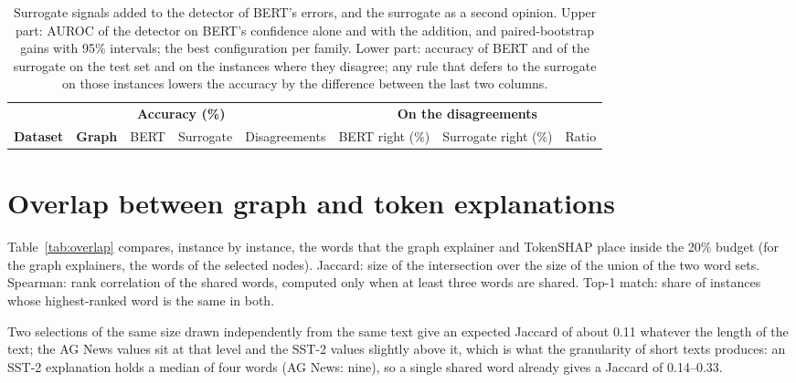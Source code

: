 \documentclass[review,12pt]{elsarticle}
\begin{document}
\begin{table}[H]
\centering
\scriptsize
\setlength{\tabcolsep}{4pt}
\caption{Surrogate signals added to the detector of BERT's errors, and the surrogate as a second opinion. Upper part: AUROC of the detector on BERT's confidence alone and with the addition, and paired-bootstrap gains with 95\% intervals; the best configuration per family. Lower part: accuracy of BERT and of the surrogate on the test set and on the instances where they disagree; any rule that defers to the surrogate on those instances lowers the accuracy by the difference between the last two columns.}
\label{tab:cross_model}

\vspace{0.8em}
\begin{tabular}{@{}llcccccc@{}}
\toprule
& & \multicolumn{2}{c}{\textbf{Accuracy (\%)}} & & \multicolumn{3}{c}{\textbf{On the disagreements}} \\
\cmidrule(lr){3-4} \cmidrule(lr){6-8}
\textbf{Dataset} & \textbf{Graph} & BERT & Surrogate & Disagreements & BERT right (\%) & Surrogate right (\%) & Ratio \\
\midrule

\end{tabular}
\end{table}

\section{Overlap between graph and token explanations}

Table~\ref{tab:overlap} compares, instance by instance, the words that the graph explainer and TokenSHAP place inside the 20\% budget (for the graph explainers, the words of the selected nodes). Jaccard: size of the intersection over the size of the union of the two word sets. Spearman: rank correlation of the shared words, computed only when at least three words are shared. Top-1 match: share of instances whose highest-ranked word is the same in both.

Two selections of the same size drawn independently from the same text give an expected Jaccard of about 0.11 whatever the length of the text; the AG News values sit at that level and the SST-2 values slightly above it, which is what the granularity of short texts produces: an SST-2 explanation holds a median of four words (AG News: nine), so a single shared word already gives a Jaccard of 0.14--0.33.
\end{document}
